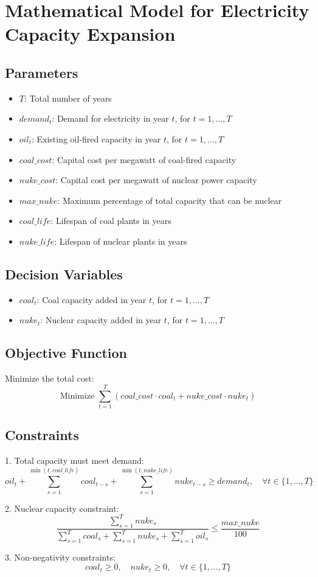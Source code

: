 \documentclass{article}
\begin{document}
\section*{Mathematical Model for Electricity Capacity Expansion}

\subsection*{Parameters}
\begin{itemize}
    \item $T$: Total number of years
    \item $demand_t$: Demand for electricity in year $t$, for $t = 1, \ldots, T$
    \item $oil_t$: Existing oil-fired capacity in year $t$, for $t = 1, \ldots, T$
    \item $coal\_cost$: Capital cost per megawatt of coal-fired capacity
    \item $nuke\_cost$: Capital cost per megawatt of nuclear power capacity
    \item $max\_nuke$: Maximum percentage of total capacity that can be nuclear
    \item $coal\_life$: Lifespan of coal plants in years
    \item $nuke\_life$: Lifespan of nuclear plants in years
\end{itemize}

\subsection*{Decision Variables}
\begin{itemize}
    \item $coal_t$: Coal capacity added in year $t$, for $t = 1, \ldots, T$
    \item $nuke_t$: Nuclear capacity added in year $t$, for $t = 1, \ldots, T$
\end{itemize}

\subsection*{Objective Function}
Minimize the total cost:
\[
\text{Minimize } \sum_{t=1}^{T} \left( coal\_cost \cdot coal_t + nuke\_cost \cdot nuke_t \right)
\]

\subsection*{Constraints}
1. Total capacity must meet demand:
\[
oil_t + \sum_{s=1}^{\min(t, coal\_life)} coal_{t-s} + \sum_{s=1}^{\min(t, nuke\_life)} nuke_{t-s} \geq demand_t, \quad \forall t \in \{1, \ldots, T\}
\]

2. Nuclear capacity constraint:
\[
\frac{\sum_{s=1}^{T} nuke_s}{\sum_{s=1}^{T} coal_s + \sum_{s=1}^{T} nuke_s + \sum_{s=1}^{T} oil_s} \leq \frac{max\_nuke}{100}
\]

3. Non-negativity constraints:
\[
coal_t \geq 0, \quad nuke_t \geq 0, \quad \forall t \in \{1, \ldots, T\}
\]
\end{document}
